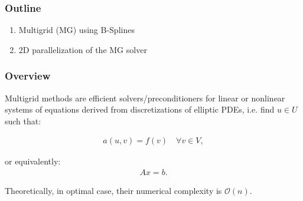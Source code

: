 
\maketitle





\begin{frame}
\frametitle{Outline}

\begin{enumerate}[I]
  \item <1-2> Multigrid (MG) using B-Splines 
  \item <1> 2D parallelization of the MG solver
\end{enumerate}
%
\end{frame}


\begin{frame}
\frametitle{Overview}
Multigrid methods are efficient solvers/preconditioners for linear or
nonlinear systems of equations derived from discretizations of elliptic PDEs, i.e. find $u \in U$ such that:

\begin{align*}
a(u, v ) = f (v ) \quad  \forall v \in V,
\end{align*}

or equivalently:
\begin{align*}
	Ax = b.
\end{align*}

Theoretically, in optimal case, their numerical complexity is $\mathcal{O}(n)$.\\

\end{frame}


